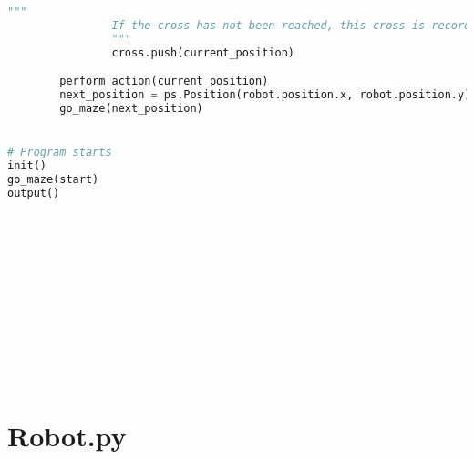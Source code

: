 \documentclass[11pt,times,oneside,openright,hardcopy]{eeereport}
\begin{document}
\begin{lstlisting}[language=Python]
                """
                If the cross has not been reached, this cross is recorded into the cross stack
                """
                cross.push(current_position)

        perform_action(current_position)
        next_position = ps.Position(robot.position.x, robot.position.y)
        go_maze(next_position)


# Program starts
init()
go_maze(start)
output()














\end{lstlisting}

\section{Robot.py}
\end{document}
